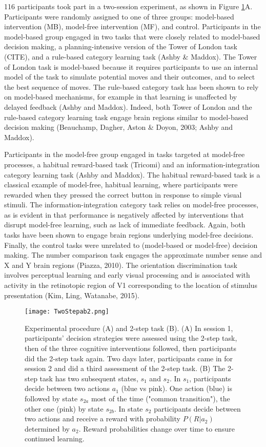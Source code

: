 \documentclass[11pt]{article} %
\begin{document}
116 participants took part in a two-session experiment, as shown in Figure \ref{TwoStep}A. Participants were randomly assigned to one of three groups: model-based intervention (MB), model-free intervention (MF), and control. Participants in the model-based group engaged in two tasks that were closely related to model-based decision making, a planning-intensive version of the Tower of London task (CITE), and a rule-based category learning task (Ashby \& Maddox). The Tower of London task is model-based because it requires participants to use an internal model of the task to simulate potential moves and their outcomes, and to select the best sequence of moves. The rule-based category task has been shown to rely on model-based mechanisms, for example in that learning is unaffected by delayed feedback (Ashby and Maddox). Indeed, both Tower of London and the rule-based category learning task engage brain regions similar to model-based decision making (Beauchamp, Dagher, Aston \& Doyon, 2003; Ashby and Maddox).

Participants in the model-free group engaged in tasks targeted at model-free processes, a habitual reward-based task (Tricomi) and an information-integration category learning task (Ashby and Maddox). The habitual reward-based task is a classical example of model-free, habitual learning, where participants were rewarded when they pressed the correct button in response to simple visual stimuli. The information-integration category task relies on model-free processes, as is evident in that performance is negatively affected by interventions that disrupt model-free learning, such as lack of immediate feedback. Again, both tasks have been shown to engage brain regions underlying model-free decisions. Finally, the control tasks were unrelated to (model-based or model-free) decision making. The number comparison task engages the approximate number sense and X and Y brain regions (Piazza, 2010). The orientation discrimination task involves perceptual learning and early visual processing and is associated with activity in the retinotopic region of V1 corresponding to the location of stimulus presentation (Kim, Ling, Watanabe, 2015). 

\begin{figure}
	\texttt{[image: TwoStepab2.png]}
	\caption{Experimental procedure (A) and 2-step task (B). (A) In session 1, participants' decision strategies were assessed using the 2-step task, then of the three cognitive interventions followed, then participants did the 2-step task again. Two days later, participants came in for session 2 and did a third assessment of the 2-step task. (B) The 2-step task has two subsequent states, $s_{1}$ and $s_{2}$. In $s_{1}$, participants decide between two actions $a_{1}$ (blue vs pink). One action (blue) is followed by state $s_{2a}$ most of the time ("common transition"), the other one (pink) by state $s_{2b}$. In state $s_{2}$ participants decide between two actions and receive a reward with probability $P(R|a_{2})$ determined by $a_{2}$. Reward probabilities change over time to ensure continued learning.}
	\label{TwoStep}
\end{figure}
\end{document}
